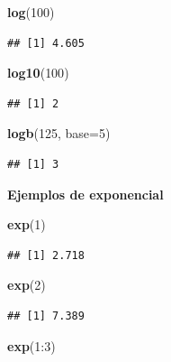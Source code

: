 \documentclass[10pt,]{krantz}
\makeatletter
\newenvironment{Shaded}{\begin{snugshade}}{\end{snugshade}}
\newcommand{\KeywordTok}[1]{\textcolor[rgb]{0.13,0.29,0.53}{\textbf{{#1}}}}
\newcommand{\DataTypeTok}[1]{\textcolor[rgb]{0.13,0.29,0.53}{{#1}}}
\newcommand{\DecValTok}[1]{\textcolor[rgb]{0.00,0.00,0.81}{{#1}}}
\newcommand{\NormalTok}[1]{{#1}}
\newenvironment{kframe}{%
\medskip{}
\setlength{\fboxsep}{.8em}
 \def\at@end@of@kframe{}%
 \ifinner\ifhmode%
  \def\at@end@of@kframe{\end{minipage}}%
  \begin{minipage}{\columnwidth}%
 \fi\fi%
 \def\FrameCommand##1{\hskip\@totalleftmargin \hskip-\fboxsep
 \colorbox{shadecolor}{##1}\hskip-\fboxsep
     \hskip-\linewidth \hskip-\@totalleftmargin \hskip\columnwidth}%
 \MakeFramed {\advance\hsize-\width
   \@totalleftmargin\z@ \linewidth\hsize
   \@setminipage}}%
 {\par\unskip\endMakeFramed%
 \at@end@of@kframe}
\renewenvironment{Shaded}{\begin{kframe}}{\end{kframe}}
\makeatother
\begin{document}
\begin{Shaded}
\begin{Highlighting}[]
\KeywordTok{log}\NormalTok{(}\DecValTok{100}\NormalTok{)}
\end{Highlighting}
\end{Shaded}

\begin{verbatim}
## [1] 4.605
\end{verbatim}

\begin{Shaded}
\begin{Highlighting}[]
\KeywordTok{log10}\NormalTok{(}\DecValTok{100}\NormalTok{)}
\end{Highlighting}
\end{Shaded}

\begin{verbatim}
## [1] 2
\end{verbatim}

\begin{Shaded}
\begin{Highlighting}[]
\KeywordTok{logb}\NormalTok{(}\DecValTok{125}\NormalTok{, }\DataTypeTok{base=}\DecValTok{5}\NormalTok{)}
\end{Highlighting}
\end{Shaded}

\begin{verbatim}
## [1] 3
\end{verbatim}

\textbf{Ejemplos de exponencial}

\begin{Shaded}
\begin{Highlighting}[]
\KeywordTok{exp}\NormalTok{(}\DecValTok{1}\NormalTok{)}
\end{Highlighting}
\end{Shaded}

\begin{verbatim}
## [1] 2.718
\end{verbatim}

\begin{Shaded}
\begin{Highlighting}[]
\KeywordTok{exp}\NormalTok{(}\DecValTok{2}\NormalTok{)}
\end{Highlighting}
\end{Shaded}

\begin{verbatim}
## [1] 7.389
\end{verbatim}

\begin{Shaded}
\begin{Highlighting}[]
\KeywordTok{exp}\NormalTok{(}\DecValTok{1}\NormalTok{:}\DecValTok{3}\NormalTok{)}
\end{Highlighting}
\end{Shaded}
\end{document}
